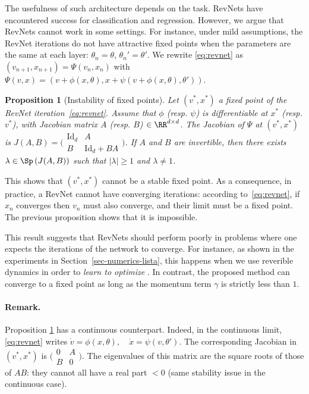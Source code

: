 \documentclass{article}
\newtheorem{proposition}{Proposition}
\begin{document}
The usefulness of such architecture depends on the task.
RevNets have encountered success for classification and regression.
However, we argue that RevNets cannot work in some settings.
For instance, under mild assumptions, the RevNet iterations do not have attractive fixed points when the parameters are the same at each layer: $\theta_n = \theta$, $\theta_n' = \theta'$.
We rewrite \eqref{eq:revnet} as $(v_{n+1}, x_{n+1}) = \Psi(v_n, x_n)$ with $\Psi(v, x) = (v + \phi(x,\theta), x + \psi(v + \phi(x,\theta),\theta'))$.
\begin{proposition}[Instability of fixed points]
\label{prop:revnet_fix}
Let $(v^*, x^*)$ a fixed point of the RevNet iteration~\eqref{eq:revnet}. Assume that $\phi$ (resp. $\psi$) is differentiable at $x^*$ (resp. $v^*$), with Jacobian matrix $A$ (resp. $B$) $\in\RR^{d\times d}$. The Jacobian of $\Psi$ at $(v^*, x^*)$ is $ J(A, B) =  \big(\begin{smallmatrix}
  \mathrm{Id}_d & A \\
B & \mathrm{Id}_d + BA
\end{smallmatrix}\big)$. 
If $A$ and $B$ are invertible, then there exists $\lambda \in \Sp\left(J(A, B)\right)$ such that $|\lambda| \geq 1$ and $\lambda \neq 1$.
\end{proposition}
This shows that $(v^*, x^*)$ cannot be a stable fixed point.
As a consequence, in practice, a RevNet cannot have converging iterations: according to~\eqref{eq:revnet}, if $x_n$ converges then $v_n$ must also converge, and their limit must be a fixed point. 
The previous proposition shows that it is impossible.

This result suggests that RevNets should perform poorly in problems where one expects the iterations of the network to converge.
For instance, as shown in the experiments in Section~\ref{sec-numerics-lista}, this happens when we use reverible dynamics in order to \emph{learn to optimize} \citep{10.5555/3045118.3045343}.
In contrast, the proposed method can converge to a fixed point as long as the momentum term $\gamma$ is strictly less than $1$.
\vspace{-1em}
\paragraph{Remark.} Proposition \ref{prop:revnet_fix} has a continuous counterpart. Indeed, in the continuous limit, \eqref{eq:revnet} writes $\dot{v} = \phi(x,\theta),  \quad \dot{x} = \psi(v,\theta')$. The corresponding Jacobian in $(v^{*}, x^{*})$ is $\big(\begin{smallmatrix}
  0 & A \\
B &  0
\end{smallmatrix}\big)$. The eigenvalues of this matrix are the square roots of those of $AB$: they cannot all have a real part $< 0$ (same stability issue in the continuous case).
\end{document}

